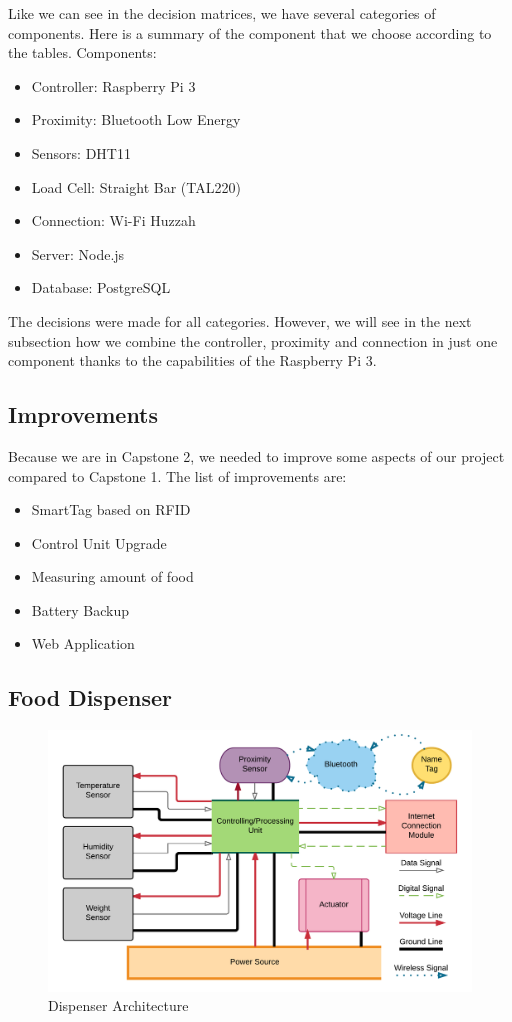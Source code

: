 \documentclass[12pt]{article}
\begin{document}
Like we can see in the decision matrices, we have several categories of components. Here is a summary of the component that we choose according to the tables. Components:

\begin{itemize}
  \item Controller: Raspberry Pi 3
  \item Proximity: Bluetooth Low Energy
  \item Sensors: DHT11
  \item Load Cell: Straight Bar (TAL220)
  \item Connection: Wi-Fi Huzzah
  \item Server: Node.js
  \item Database: PostgreSQL
\end{itemize}

The decisions were made for all categories. However, we will see in the next subsection how we combine the controller, proximity and connection in just one component thanks to the capabilities of the Raspberry Pi 3.

\subsection{Improvements}

Because we are in Capstone 2, we needed to improve some aspects of our project compared to Capstone 1. The list of improvements are:

\begin{itemize}
    \item SmartTag based on RFID
    \item Control Unit Upgrade
    \item Measuring amount of food
    \item Battery Backup
    \item Web Application
\end{itemize}


\subsection{Food Dispenser}

\begin{figure}[!htb]
  \includegraphics[width=\textwidth]{Figures/ArchitectureDispenser}
  \caption{Dispenser Architecture}
  \label{fig:ArchDispenser}
\end{figure}
\end{document}
